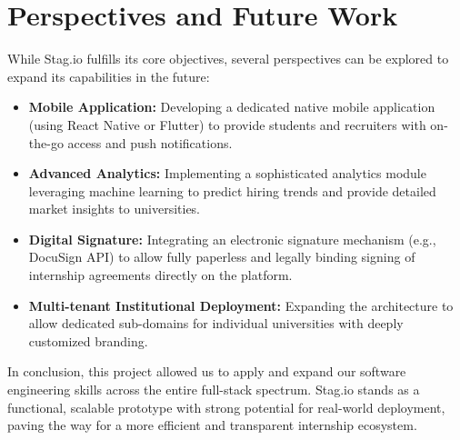 \section*{Perspectives and Future Work}
While Stag.io fulfills its core objectives, several perspectives can be explored to expand its capabilities in the future:
\begin{itemize}
    \item \textbf{Mobile Application:} Developing a dedicated native mobile application (using React Native or Flutter) to provide students and recruiters with on-the-go access and push notifications.
    \item \textbf{Advanced Analytics:} Implementing a sophisticated analytics module leveraging machine learning to predict hiring trends and provide detailed market insights to universities.
    \item \textbf{Digital Signature:} Integrating an electronic signature mechanism (e.g., DocuSign API) to allow fully paperless and legally binding signing of internship agreements directly on the platform.
    \item \textbf{Multi-tenant Institutional Deployment:} Expanding the architecture to allow dedicated sub-domains for individual universities with deeply customized branding. 
\end{itemize}

In conclusion, this project allowed us to apply and expand our software engineering skills across the entire full-stack spectrum. Stag.io stands as a functional, scalable prototype with strong potential for real-world deployment, paving the way for a more efficient and transparent internship ecosystem.
